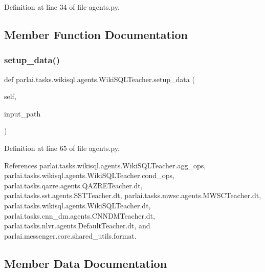 Definition at line 34 of file agents.\+py.



\subsection{Member Function Documentation}
\mbox{\label{classparlai_1_1tasks_1_1wikisql_1_1agents_1_1WikiSQLTeacher_ac640a241c4e9ac29feddd1ecbbb35509}} 
\subsubsection{\texorpdfstring{setup\+\_\+data()}{setup\_data()}}
{\footnotesize\ttfamily def parlai.\+tasks.\+wikisql.\+agents.\+Wiki\+S\+Q\+L\+Teacher.\+setup\+\_\+data (\begin{DoxyParamCaption}\item[{}]{self,  }\item[{}]{input\+\_\+path }\end{DoxyParamCaption})}



Definition at line 65 of file agents.\+py.



References parlai.\+tasks.\+wikisql.\+agents.\+Wiki\+S\+Q\+L\+Teacher.\+agg\+\_\+ops, parlai.\+tasks.\+wikisql.\+agents.\+Wiki\+S\+Q\+L\+Teacher.\+cond\+\_\+ops, parlai.\+tasks.\+qazre.\+agents.\+Q\+A\+Z\+R\+E\+Teacher.\+dt, parlai.\+tasks.\+sst.\+agents.\+S\+S\+T\+Teacher.\+dt, parlai.\+tasks.\+mwsc.\+agents.\+M\+W\+S\+C\+Teacher.\+dt, parlai.\+tasks.\+wikisql.\+agents.\+Wiki\+S\+Q\+L\+Teacher.\+dt, parlai.\+tasks.\+cnn\+\_\+dm.\+agents.\+C\+N\+N\+D\+M\+Teacher.\+dt, parlai.\+tasks.\+nlvr.\+agents.\+Default\+Teacher.\+dt, and parlai.\+messenger.\+core.\+shared\+\_\+utils.\+format.



\subsection{Member Data Documentation}
\mbox{\label{classparlai_1_1tasks_1_1wikisql_1_1agents_1_1WikiSQLTeacher_acac9910a97f5b0ee9af7e9bd8a7e2d78}} 
